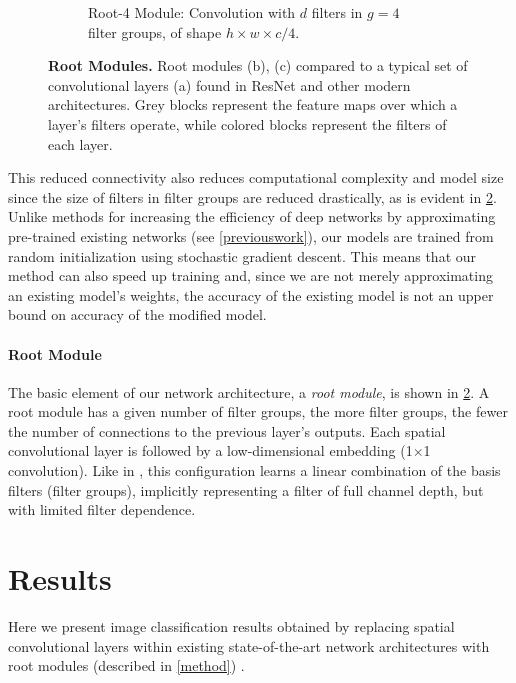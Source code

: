 \documentclass[thesis]{subfiles}
\begin{document}
\begin{figure}[tb]
\begin{subfigure}[b]{0.6\linewidth}
			\caption{Root-4 Module: Convolution with $d$ filters in $g = 4$ filter groups, of shape $h\times w\times c/4$.}
			\label{fig:rootresnet4}
		\end{subfigure}
		\caption{\textbf{Root Modules.} Root modules (b), (c) compared to a typical set of convolutional layers (a) found in ResNet and other modern architectures. Grey blocks represent the feature maps over which a layer's filters operate, while colored blocks represent the filters of each layer. 
		}
		\label{fig:rootmodule}
	\end{figure}
	This reduced connectivity also reduces computational complexity and model size since the size of filters in filter groups are reduced drastically, as is evident in \cref{fig:rootmodule}. Unlike methods for increasing the efficiency of deep networks by approximating pre-trained existing networks (see \cref{previouswork}), our models are trained from random initialization using stochastic gradient descent. This means that our method can also speed up training and, since we are not merely approximating an existing model's weights, the accuracy of the existing model is not an upper bound on accuracy of the modified model.
	
	\paragraph{Root Module}
	The basic element of our network architecture, a \emph{root module}, is shown in \cref{fig:rootmodule}. A root module has a given number of filter groups, the more filter groups, the fewer the number of connections to the previous layer's outputs. Each spatial convolutional layer is followed by a low-dimensional embedding (1$\times$1 convolution). Like in \citep{Ioannou2016}, this configuration  learns a linear combination of the basis filters (filter groups), implicitly representing a filter of full channel depth, but with limited filter dependence.
	
	\section{Results}
	Here we present image classification results obtained by replacing spatial convolutional layers within existing state-of-the-art network architectures with root modules (described in \cref{method}) .
	
\end{document}
